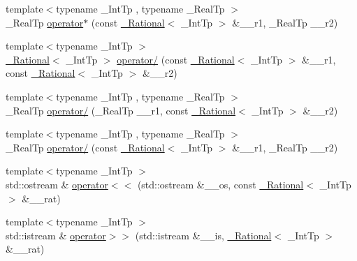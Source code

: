 \begin{DoxyCompactItemize}
\item 
{\footnotesize template$<$typename \+\_\+\+Int\+Tp , typename \+\_\+\+Real\+Tp $>$ }\\\+\_\+\+Real\+Tp \hyperlink{namespace____gnu__cxx_a1db4d29ae3d034851c4b09a20273eb0b}{operator$\ast$} (const \hyperlink{class____gnu__cxx_1_1__Rational}{\+\_\+\+Rational}$<$ \+\_\+\+Int\+Tp $>$ \&\+\_\+\+\_\+r1, \+\_\+\+Real\+Tp \+\_\+\+\_\+r2)
\item 
{\footnotesize template$<$typename \+\_\+\+Int\+Tp $>$ }\\\hyperlink{class____gnu__cxx_1_1__Rational}{\+\_\+\+Rational}$<$ \+\_\+\+Int\+Tp $>$ \hyperlink{namespace____gnu__cxx_a67264d9df2f676cda11c7a3ab8f92bf1}{operator/} (const \hyperlink{class____gnu__cxx_1_1__Rational}{\+\_\+\+Rational}$<$ \+\_\+\+Int\+Tp $>$ \&\+\_\+\+\_\+r1, const \hyperlink{class____gnu__cxx_1_1__Rational}{\+\_\+\+Rational}$<$ \+\_\+\+Int\+Tp $>$ \&\+\_\+\+\_\+r2)
\item 
{\footnotesize template$<$typename \+\_\+\+Int\+Tp , typename \+\_\+\+Real\+Tp $>$ }\\\+\_\+\+Real\+Tp \hyperlink{namespace____gnu__cxx_abc432e82150d2e400ec89b3a203f6671}{operator/} (\+\_\+\+Real\+Tp \+\_\+\+\_\+r1, const \hyperlink{class____gnu__cxx_1_1__Rational}{\+\_\+\+Rational}$<$ \+\_\+\+Int\+Tp $>$ \&\+\_\+\+\_\+r2)
\item 
{\footnotesize template$<$typename \+\_\+\+Int\+Tp , typename \+\_\+\+Real\+Tp $>$ }\\\+\_\+\+Real\+Tp \hyperlink{namespace____gnu__cxx_a7ad2dbc41c8815732436adfc0e4f7b7f}{operator/} (const \hyperlink{class____gnu__cxx_1_1__Rational}{\+\_\+\+Rational}$<$ \+\_\+\+Int\+Tp $>$ \&\+\_\+\+\_\+r1, \+\_\+\+Real\+Tp \+\_\+\+\_\+r2)
\item 
{\footnotesize template$<$typename \+\_\+\+Int\+Tp $>$ }\\std\+::ostream \& \hyperlink{namespace____gnu__cxx_a51b459a56e08b4050d384a3436a650aa}{operator$<$$<$} (std\+::ostream \&\+\_\+\+\_\+os, const \hyperlink{class____gnu__cxx_1_1__Rational}{\+\_\+\+Rational}$<$ \+\_\+\+Int\+Tp $>$ \&\+\_\+\+\_\+rat)
\item 
{\footnotesize template$<$typename \+\_\+\+Int\+Tp $>$ }\\std\+::istream \& \hyperlink{namespace____gnu__cxx_a65f7d9a485c3c779aca0f5fb3e807b55}{operator$>$$>$} (std\+::istream \&\+\_\+\+\_\+is, \hyperlink{class____gnu__cxx_1_1__Rational}{\+\_\+\+Rational}$<$ \+\_\+\+Int\+Tp $>$ \&\+\_\+\+\_\+rat)
\end{DoxyCompactItemize}


